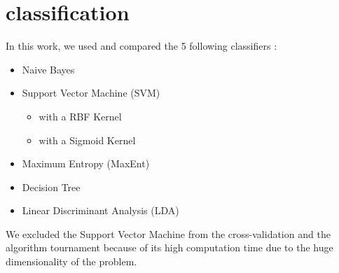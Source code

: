 \section{classification}

In this work, we used and compared the 5 following classifiers :

\begin{itemize}
 \item Naive Bayes
 \item {Support Vector Machine (SVM)
	\begin{itemize}
	 \item with a RBF Kernel
	 \item with a Sigmoid Kernel
	\end{itemize}}
 \item Maximum Entropy (MaxEnt)
 \item Decision Tree
 \item Linear Discriminant Analysis (LDA)
\end{itemize}

We excluded the Support Vector Machine from the cross-validation and 
the algorithm tournament because of its high computation time due to the huge
dimensionality of the problem.